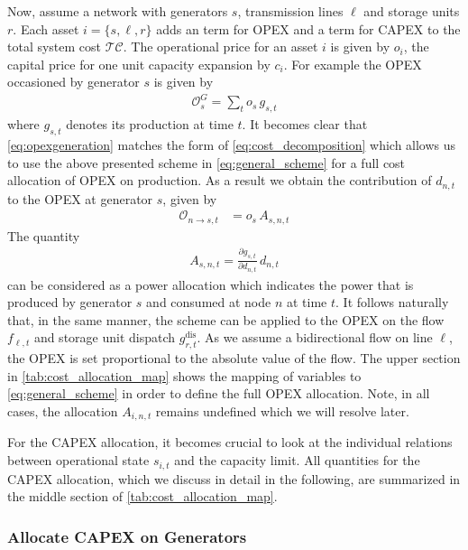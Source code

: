 \documentclass[11pt,twocolumn]{article}
\newcommand{\pdv}[2]{\frac{\partial #1}{\partial #2}}
\newcommand{\state}{s_{i,t}}
\newcommand{\generation}{g_{s,t}}
\newcommand{\operationalpricegeneration}{o_{s}}
\newcommand{\flow}{f_{\ell,t}}
\newcommand{\storage}{g_{r,t}}
\newcommand{\storagedispatch}{\storage^\text{dis}}
\newcommand{\demand}[1][n]{d_{#1,t}}
\newcommand{\allocatepeer}[1][s, n]{A_{#1,t}}
\newcommand{\allocatestate}[1][i, n]{A_{#1,t}}
\newcommand{\allocateopex}[1][n]{\mathcal{O}_{#1,t}}
\newcommand{\totalcost}{\mathcal{TC}}
\newcommand{\opexgeneration}{\mathcal{O}^G}
\begin{document}
Now, assume a network with generators $s$, transmission lines $\ell$ and storage units $r$. Each asset $i = \{s, \ell, r\}$ adds an term for OPEX and a term for CAPEX to the total system cost $\totalcost$. The operational price for an asset $i$ is given by $o_i$, the capital price for one unit capacity expansion by $c_i$. For example the OPEX occasioned by generator $s$ is given by 
\begin{align}
    \opexgeneration_s = \sum_t \operationalpricegeneration \, \generation 
    \label{eq:opexgeneration}
\end{align}
where $\generation$ denotes its production at time $t$. It becomes clear that \cref{eq:opexgeneration} matches the form of \cref{eq:cost_decomposition} which allows us to use the above presented scheme in \cref{eq:general_scheme} for a full cost allocation of OPEX on production. As a result we obtain the contribution of $\demand$ to the OPEX at generator $s$, given by 
\begin{align}
    \allocateopex[n \rightarrow s] &= 
   \operationalpricegeneration \,  \allocatepeer
\label{eq:allocate_opexGeneration_detailed}
\end{align}
The quantity  
\begin{align}
 \allocatepeer = \pdv{\generation}{\demand} \, \demand
 \label{eq:allocate_peer}
\end{align}
can be considered as a power allocation which indicates the power that is produced by generator $s$ and consumed at node $n$ at time $t$.
It follows naturally that, in the same manner, the scheme can be applied to the OPEX on the flow $\flow$ and storage unit dispatch $\storagedispatch$. As we assume a bidirectional flow on line $\ell$, the OPEX is set proportional to the absolute value of the flow. The upper section in \cref{tab:cost_allocation_map} shows the mapping of variables to \cref{eq:general_scheme} in order to define the full OPEX allocation. Note, in all cases, the allocation $\allocatestate$ remains undefined which we will resolve later.



For the CAPEX allocation, it becomes crucial to look at the individual relations between operational state $\state$ and the capacity limit. All quantities for the CAPEX allocation, which we discuss in detail in the following, are summarized in the middle section of \cref{tab:cost_allocation_map}.  

\subsubsection*{Allocate CAPEX on Generators}
\end{document}
